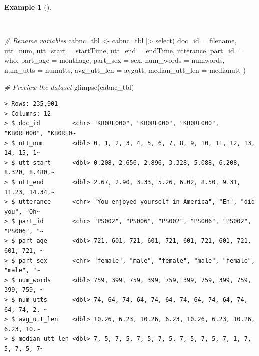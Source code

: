 \documentclass[
  letterpaper,
  DIV=11,
  numbers=noendperiod]{scrreport}
\newenvironment{Shaded}{\begin{snugshade}}{\end{snugshade}}
\newcommand{\AttributeTok}[1]{\textcolor[rgb]{0.00,0.00,0.00}{#1}}
\newcommand{\CommentTok}[1]{\textcolor[rgb]{0.00,0.00,0.00}{\textit{#1}}}
\newcommand{\FunctionTok}[1]{\textcolor[rgb]{0.00,0.00,0.00}{#1}}
\newcommand{\NormalTok}[1]{\textcolor[rgb]{0.00,0.00,0.00}{#1}}
\newcommand{\OtherTok}[1]{\textcolor[rgb]{0.00,0.00,0.00}{#1}}
\newcommand{\SpecialCharTok}[1]{\textcolor[rgb]{0.00,0.00,0.00}{#1}}
\theoremstyle{definition}
\newtheorem{example}{Example}[chapter]
\theoremstyle{remark}
\begin{document}
\begin{example}[]\protect\hypertarget{exm-cd-cabnc-rename-vars}{}\label{exm-cd-cabnc-rename-vars}

~

\begin{Shaded}
\begin{Highlighting}[]
\CommentTok{\# Rename variables}
\NormalTok{cabnc\_tbl }\OtherTok{\textless{}{-}} 
\NormalTok{  cabnc\_tbl }\SpecialCharTok{|\textgreater{}} 
  \FunctionTok{select}\NormalTok{(}
    \AttributeTok{doc\_id =}\NormalTok{ filename,}
\NormalTok{    utt\_num,}
    \AttributeTok{utt\_start =}\NormalTok{ startTime,}
    \AttributeTok{utt\_end =}\NormalTok{ endTime,}
\NormalTok{    utterance,}
    \AttributeTok{part\_id =}\NormalTok{ who,}
    \AttributeTok{part\_age =}\NormalTok{ monthage,}
    \AttributeTok{part\_sex =}\NormalTok{ sex,}
    \AttributeTok{num\_words =}\NormalTok{ numwords,}
    \AttributeTok{num\_utts =}\NormalTok{ numutts,}
    \AttributeTok{avg\_utt\_len =}\NormalTok{ avgutt,}
    \AttributeTok{median\_utt\_len =}\NormalTok{ medianutt}
\NormalTok{  )}

\CommentTok{\# Preview the dataset}
\FunctionTok{glimpse}\NormalTok{(cabnc\_tbl)}
\end{Highlighting}
\end{Shaded}

\begin{verbatim}
> Rows: 235,901
> Columns: 12
> $ doc_id         <chr> "KB0RE000", "KB0RE000", "KB0RE000", "KB0RE000", "KB0RE0~
> $ utt_num        <dbl> 0, 1, 2, 3, 4, 5, 6, 7, 8, 9, 10, 11, 12, 13, 14, 15, 1~
> $ utt_start      <dbl> 0.208, 2.656, 2.896, 3.328, 5.088, 6.208, 8.320, 8.480,~
> $ utt_end        <dbl> 2.67, 2.90, 3.33, 5.26, 6.02, 8.50, 9.31, 11.23, 14.34,~
> $ utterance      <chr> "You enjoyed yourself in America", "Eh", "did you", "Oh~
> $ part_id        <chr> "PS002", "PS006", "PS002", "PS006", "PS002", "PS006", "~
> $ part_age       <dbl> 721, 601, 721, 601, 721, 601, 721, 601, 721, 601, 721, ~
> $ part_sex       <chr> "female", "male", "female", "male", "female", "male", "~
> $ num_words      <dbl> 759, 399, 759, 399, 759, 399, 759, 399, 759, 399, 759, ~
> $ num_utts       <dbl> 74, 64, 74, 64, 74, 64, 74, 64, 74, 64, 74, 64, 74, 2, ~
> $ avg_utt_len    <dbl> 10.26, 6.23, 10.26, 6.23, 10.26, 6.23, 10.26, 6.23, 10.~
> $ median_utt_len <dbl> 7, 5, 7, 5, 7, 5, 7, 5, 7, 5, 7, 5, 7, 1, 7, 5, 7, 5, 7~
\end{verbatim}

\end{example}
\end{document}
